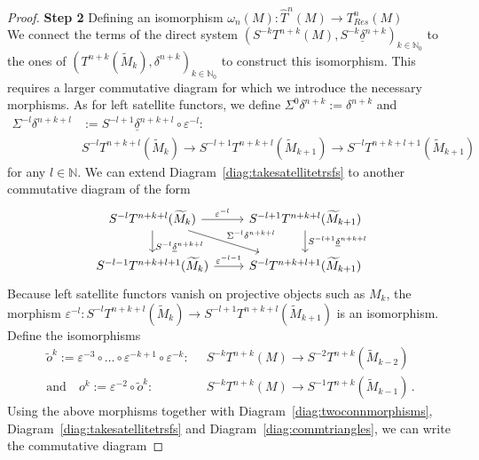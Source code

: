 \documentclass[12pt,a4paper]{article}
\numberwithin{equation}{section}
\theoremstyle{nonumberplain}
\newtheorem{proof}{Proof}
\begin{document}
\begin{proof}
{\textbf{Step 2}} Defining an isomorphism $\omega_n(M): \widehat{T}^n(M) \rightarrow T_{Res}^n(M)$ \\

We connect the terms of the direct system $(S^{-k}T^{n+k}(M), S^{-k}\underline{\delta}^{n+k})_{k \in \mathbb{N}_0}$ to the ones of $(T^{n+k}(\widetilde{M}_k), \delta^{n+k})_{k \in \mathbb{N}_0}$ to construct this isomorphism. This requires a larger commutative diagram for which we introduce the necessary morphisms. As for left satellite functors, we define $\Sigma^0{\delta^{n+k}} := \delta^{n+k}$ and
\begin{align}
\Sigma^{-l}\delta^{n+k+l} &:= S^{-l+1}\underline{\delta}^{n+k+l} \circ \varepsilon^{-l}: \label{eq:sigmafunctors}  \\
&S^{-l}T^{n+k+l}(\widetilde{M}_k) \rightarrow S^{-l+1}T^{n+k+l}(\widetilde{M}_{k+1}) \rightarrow S^{-l}T^{n+k+l+1}(\widetilde{M}_{k+1}) \nonumber
\end{align}
for any $l \in \mathbb{N}$. We can extend Diagram~\ref{diag:takesatellitetrsfs} to another commutative diagram of the form
\begin{equation}\label{diag:commtriangles}
\begin{tikzcd}
    S^{-l}T^{n+k+l}(\widetilde{M}_k) \arrow[r, "\varepsilon^{-l}"] \arrow[dr, "\Sigma^{-l}\delta^{n+k+l}"] \arrow[d, "S^{-l}\underline{\delta}^{n+k+l}" near end] & S^{-l+1}T^{n+k+l}(\widetilde{M}_{k+1}) \arrow[d, "S^{-l+1}\underline{\delta}^{n+k+l}"] \\
    S^{-l-1}T^{n+k+l+1}(\widetilde{M}_k) \arrow[r, "\varepsilon^{-l-1}"] & S^{-l}T^{n+k+l+1}(\widetilde{M}_{k+1})
\end{tikzcd}
\end{equation}
Because left satellite functors vanish on projective objects such as $M_k$, the morphism $\varepsilon^{-l}: S^{-l}T^{n+k+l}(\widetilde{M}_k) \rightarrow S^{-l+1}T^{n+k+l}(\widetilde{M}_{k+1})$ is an isomorphism. Define the isomorphisms
\begin{align}
\widetilde{o}^k := \varepsilon^{-3} \circ {} \dots {} \circ \varepsilon^{-k+1} \circ \varepsilon^{-k}: \; \; {} &S^{-k}T^{n+k}(M) \rightarrow S^{-2}T^{n+k}(\widetilde{M}_{k-2}) \nonumber \\
\text{and} \quad o^{k} := \varepsilon^{-2} \circ \widetilde{o}^k: \; \; {} &S^{-k}T^{n+k}(M) \rightarrow S^{-1}T^{n+k}(\widetilde{M}_{k-1}) \, . \label{eq:themapsok}
\end{align}
Using the above morphisms together with Diagram~\ref{diag:twoconnmorphisms}, Diagram~\ref{diag:takesatellitetrsfs} and Diagram~\ref{diag:commtriangles}, we can write the commutative diagram


\end{proof}
\end{document}
